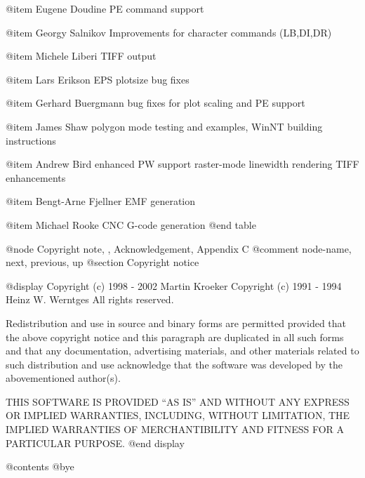 @item Eugene Doudine
PE command support

@item Georgy Salnikov 
Improvements for character commands (LB,DI,DR)

@item Michele Liberi
TIFF output

@item Lars Erikson
EPS plotsize bug fixes

@item Gerhard Buergmann
bug fixes for plot scaling and PE support

@item James Shaw
polygon mode testing and examples, 
WinNT building instructions

@item Andrew Bird
enhanced PW support
raster-mode linewidth rendering
TIFF enhancements

@item Bengt-Arne Fjellner
EMF generation

@item Michael Rooke
CNC G-code generation
@end table



@node Copyright note, , Acknowledgement, Appendix C
@comment  node-name,  next,  previous,  up
@section Copyright notice

@display
Copyright (c) 1998 - 2002  Martin Kroeker
Copyright (c) 1991 - 1994  Heinz W. Werntges
All rights reserved.

Redistribution and use in source and binary forms are permitted provided that
the above copyright notice and this paragraph are duplicated in all such forms
and that any documentation, advertising materials, and other materials related
to such distribution and use acknowledge that the software was developed
by the abovementioned author(s).

THIS SOFTWARE IS PROVIDED ``AS IS'' AND WITHOUT ANY EXPRESS
OR IMPLIED WARRANTIES, INCLUDING, WITHOUT LIMITATION,
THE IMPLIED WARRANTIES OF MERCHANTIBILITY AND FITNESS
FOR A PARTICULAR PURPOSE.
@end display

@contents
@bye

